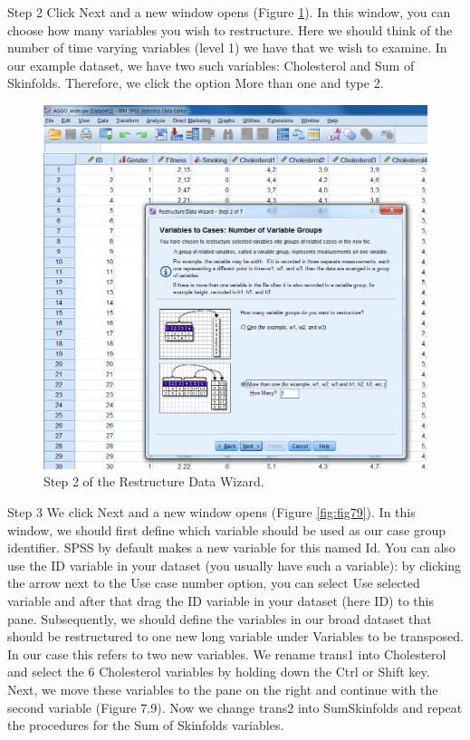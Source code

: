 \documentclass[]{book}
\theoremstyle{definition}
\theoremstyle{definition}
\theoremstyle{definition}
\theoremstyle{remark}
\begin{document}
Step 2 Click Next and a new window opens (Figure \ref{fig:fig78}). In
this window, you can choose how many variables you wish to restructure.
Here we should think of the number of time varying variables (level 1)
we have that we wish to examine. In our example dataset, we have two
such variables: Cholesterol and Sum of Skinfolds. Therefore, we click
the option More than one and type 2.

\begin{figure}

{\centering \includegraphics[width=0.9\linewidth]{images/fig7.8} 

}

\caption{Step 2 of the Restructure Data Wizard.}\label{fig:fig78}
\end{figure}

Step 3 We click Next and a new window opens (Figure \ref{fig:fig79}). In
this window, we should first define which variable should be used as our
case group identifier. SPSS by default makes a new variable for this
named Id. You can also use the ID variable in your dataset (you usually
have such a variable): by clicking the arrow next to the Use case number
option, you can select Use selected variable and after that drag the ID
variable in your dataset (here ID) to this pane. Subsequently, we should
define the variables in our broad dataset that should be restructured to
one new long variable under Variables to be transposed. In our case this
refers to two new variables. We rename trans1 into Cholesterol and
select the 6 Cholesterol variables by holding down the Ctrl or Shift
key. Next, we move these variables to the pane on the right and continue
with the second variable (Figure 7.9). Now we change trans2 into
SumSkinfolds and repeat the procedures for the Sum of Skinfolds
variables.
\end{document}
